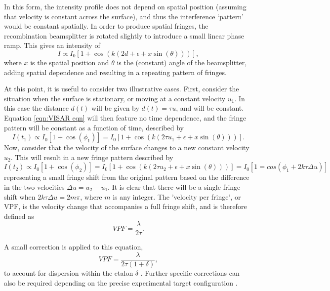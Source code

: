 In this form, the intensity profile does not depend on spatial position (assuming that velocity is constant across the surface), and thus the interference `pattern' would be constant spatially. In order to produce spatial fringes, the recombination beamsplitter is rotated slightly to introduce a small linear phase ramp. This gives an intensity of \begin{equation} \label{eqn:VISAR eqn}I \propto  I_0 [1 + \cos(k (2d + \epsilon + x\sin(\theta) ))],\end{equation} where $x$ is the spatial position and $\theta$ is the (constant) angle of the beamsplitter, adding spatial dependence and resulting in a repeating pattern of fringes.

At this point, it is useful to consider two illustrative cases. First, consider the situation when the surface is stationary, or moving at a constant velocity $u_1$. In this case the distance $d(t)$ will be given by $d(t) = \tau u$, and will be constant. Equation \ref{eqn:VISAR eqn} will then feature no time dependence, and the fringe pattern will be constant as a function of time, described by 
\begin{equation} I(t_1) \propto I_0 [1 + \cos(\phi_1)] =  I_0 [1 + \cos(k (2\tau u_1 + \epsilon + x\sin(\theta)))].\end{equation}
Now, consider that the velocity of the surface changes to a new constant velocity $u_2$. This will result in a new fringe pattern described by \begin{equation}I(t_2) \propto I_0 [1 + \cos(\phi_2)] =  I_0 [1 + \cos(k (2\tau u_2 + \epsilon + x\sin(\theta)))] = I_0 [1 = cos(\phi_1 + 2k\tau \Delta u)] \end{equation}
representing a small fringe shift from the original pattern based on the difference in the two velocities $\Delta u = u_2 - u_1$. It is clear that there will be a single fringe shift when $2k\tau \Delta u = 2 m \pi$, where $m$ is any integer. The 'velocity per fringe', or VPF, is the velocity change that accompanies a full fringe shift, and is therefore defined as \begin{equation} VPF = \frac{\lambda}{2\tau}. \end{equation}

A small correction is applied to this equation, \begin{equation} VPF = \frac{\lambda}{2\tau (1 + \delta)}, \end{equation} to account for dispersion within the etalon $\delta$ \cite{Barker1974}. Further specific corrections can also be required depending on the precise experimental target configuration \cite{Barker1970, Celliers2004}.

